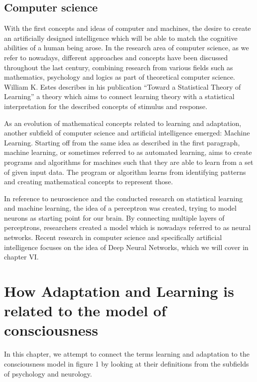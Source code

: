 \documentclass[conference]{IEEEtran}
\begin{document}
	\subsection{Computer science}\label{CS}
		With the first concepts and ideas of computer and machines, the desire to create an artificially designed intelligence which will be able to match the cognitive abilities of a human being arose. In the research area of computer science, as we refer to nowadays, different approaches and concepts have been discussed throughout the last century, combining research from various fields such as mathematics, psychology and logics as part of theoretical computer science. William K. Estes describes in his publication “Toward a Statistical Theory of Learning” \cite{d7} a theory which aims to connect learning theory with a statistical interpretation for the described concepts of stimulus and response.

		As an evolution of mathematical concepts related to learning and adaptation, another subfield of computer science and artificial intelligence emerged: Machine Learning. Starting off from the same idea as described in the first paragraph, machine learning, or sometimes referred to as automated learning, aims to create programs and algorithms for machines such that they are able to learn from a set of given input data. The program or algorithm learns from identifying patterns and creating mathematical concepts to represent those. \cite{d8}

		In reference to neuroscience and the conducted research on statistical learning and machine learning, the idea of a perceptron was created, trying to model neurons as starting point for our brain. By connecting multiple layers of perceptrons, researchers created a model which is nowadays referred to as neural networks. Recent research in computer science and specifically artificial intelligence focuses on the idea of Deep Neural Networks, which we will cover in chapter VI.



\section{How Adaptation and Learning is related to the model of consciousness}

	In this chapter, we attempt to connect the terms learning and adaptation to the consciousness model in figure 1 by looking at their definitions from the subfields of psychology and neurology.
\end{document}
